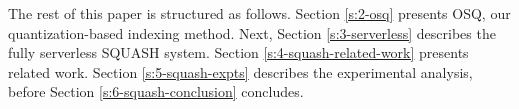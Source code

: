 The rest of this paper is structured as follows. Section \ref{s:2-osq} presents OSQ, our quantization-based indexing method. Next, Section \ref{s:3-serverless} describes the fully serverless SQUASH system. Section \ref{s:4-squash-related-work} presents related work. Section \ref{s:5-squash-expts} describes the experimental analysis, before Section \ref{s:6-squash-conclusion} concludes.
